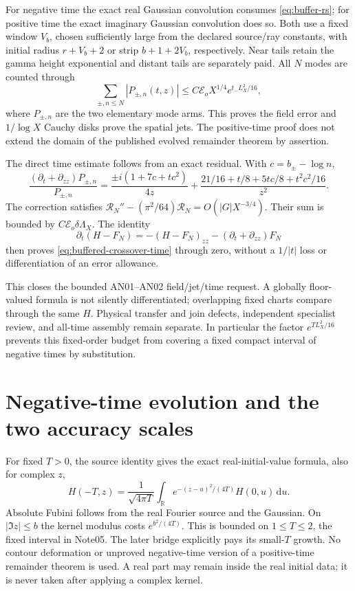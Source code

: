 \documentclass[11pt]{article}
\newcommand{\R}{\mathbb R}
\newcommand{\dd}{\,\mathrm d}
\numberwithin{equation}{section}
\begin{document}
For negative time the exact real Gaussian convolution consumes
\eqref{eq:buffer-rs}; for positive time the exact imaginary Gaussian
convolution does so. Both use a fixed window \(V_b\), chosen sufficiently
large from the declared source/ray constants, with initial radius
\(r+V_b+2\) or strip \(b+1+2V_b\), respectively. Near tails retain
the gamma height exponential and distant tails are separately paid.
All \(N\) modes are counted through
\[
 \sum_{\pm,n\le N}|P_{\pm,n}(t,z)|
 \le C\mathcal E_o X^{1/4}e^{t_-L_X^2/16},
\]
where \(P_{\pm,n}\) are the two elementary mode arms.
This proves the field error and \(1/\log X\) Cauchy disks prove the
spatial jets. The positive-time proof does not extend the domain of
the published evolved remainder theorem by assertion.

The direct time estimate follows from an exact residual. With
\(c=b_\pm-\log n\),
\begin{equation}
 \frac{(\partial_t+\partial_{zz})P_{\pm,n}}{P_{\pm,n}}
 =\frac{\pm i(1+7c+tc^2)}{4z}
 +\frac{21/16+t/8+5tc/8+t^2c^2/16}{z^2}.
 \label{eq:mode-residual}
\end{equation}
The correction satisfies
\(\mathcal R_N''-(\pi^2/64)\mathcal R_N=O(|G|X^{-3/4})\).
Their sum is bounded by \(C\mathcal E_o\delta\Lambda_X\).
The identity
\[
 \partial_t(H-F_N)=-(H-F_N)_{zz}
                   -(\partial_t+\partial_{zz})F_N
\]
then proves \eqref{eq:buffered-crossover-time} through zero, without a
\(1/|t|\) loss or differentiation of an error allowance.

This closes the bounded AN01--AN02 field/jet/time request. A globally
floor-valued formula is not silently differentiated; overlapping fixed
charts compare through the same \(H\). Physical transfer and join
defects, independent specialist review, and all-time assembly remain
separate. In particular the factor \(e^{TL_X^2/16}\) prevents this
fixed-order budget from covering a fixed compact interval of negative
times by substitution.


\section{Negative-time evolution and the two accuracy scales}
\label{sec:negative}
For fixed \(T>0\), the source identity gives the exact real-initial-value
formula, also for complex \(z\),
\begin{equation}
 H(-T,z)=\frac1{\sqrt{4\pi T}}\int_{\R}
 e^{-(z-u)^2/(4T)}H(0,u)\dd u.
 \label{eq:negative-real-initial}
\end{equation}
Absolute Fubini follows from the real Fourier source and the Gaussian.
On \(|\Im z|\le b\) the kernel modulus costs \(e^{b^2/(4T)}\).
This is bounded on \(1\le T\le2\), the fixed interval in
Note05. The later bridge explicitly pays its small-\(T\) growth.
No contour deformation or unproved negative-time version of a
positive-time remainder theorem is used. A real part may remain inside
the real initial data; it is never taken after applying a complex kernel.
\end{document}
